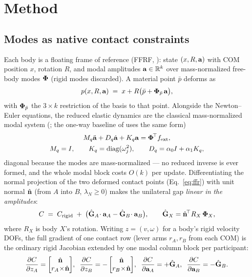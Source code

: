 \section{Method}
\label{sec:method}

\subsection{Modes as native contact constraints}
\label{sec:method:constraint}
Each body is a floating frame of reference (FFRF,
\citealp{shabana_multibody}): state
$(x,R,\mathbf{a})$ with COM position $x$, rotation $R$, and modal amplitudes
$\mathbf{a}\in\mathbb{R}^k$ over mass-normalized free-body modes $\boldsymbol{\Phi}$ (rigid
modes discarded). A material point $\bar p$ deforms as
\begin{equation}
  p(x,R,\mathbf{a}) \;=\; x + R\big(\bar p + \boldsymbol{\Phi}_{\bar p}\,\mathbf{a}\big),
  \label{eq:ffr}
\end{equation}
with $\boldsymbol{\Phi}_{\bar p}$ the $3\times k$ restriction of the basis to that point.
Alongside the Newton--Euler equations, the reduced elastic dynamics are the
classical mass-normalized modal system (\citealp{shabana_multibody,
james2002dyrt}; the one-way baseline of \citealp{coevoet2020distant} uses the
same form)
\begin{equation}
\begin{gathered}
  M_q\ddot{\mathbf{a}} + D_q\dot{\mathbf{a}} + K_q\mathbf{a} = \boldsymbol{\Phi}^{\!\top} f_{\mathrm{ext}},\\
  M_q=I,\qquad K_q=\operatorname{diag}(\omega_j^2),\qquad
  D_q=\alpha_0 I+\alpha_1 K_q,
\end{gathered}
  \label{eq:reduced}
\end{equation}
diagonal because the modes are mass-normalized --- no reduced inverse is ever
formed, and the whole modal block costs $O(k)$ per update. Differentiating the
normal projection of the two deformed contact points (Eq.~\ref{eq:ffr}) with unit
normal $\hat{\mathbf{n}}$ (from $A$ into $B$, $\lambda_N\ge0$) makes the unilateral gap
\emph{linear in the amplitudes}:
\begin{equation}
  C \;=\; C_{\mathrm{rigid}} \;+\; \big(\hat{\mathbf{G}}_A\!\cdot\mathbf{a}_A - \hat{\mathbf{G}}_B\!\cdot\mathbf{a}_B\big),
  \qquad \hat{\mathbf{G}}_X = \hat{\mathbf{n}}^{\!\top} R_X\, \boldsymbol{\Phi}_X ,
  \label{eq:gap}
\end{equation}
where $R_X$ is body $X$'s rotation. Writing $z=(v,\omega)$ for a body's rigid
velocity DOFs, the full gradient of one contact row (lever arms $r_A,r_B$ from each
COM) is the ordinary rigid Jacobian extended by one modal column block per
participant:
\begin{equation}
  \frac{\partial C}{\partial z_A} = \begin{bmatrix}\hat{\mathbf{n}}\\ r_A\!\times\!\hat{\mathbf{n}}\end{bmatrix}\!,
  \;\;
  \frac{\partial C}{\partial z_B} = -\begin{bmatrix}\hat{\mathbf{n}}\\ r_B\!\times\!\hat{\mathbf{n}}\end{bmatrix}\!,
  \;\;
  \frac{\partial C}{\partial \mathbf{a}_A} = +\hat{\mathbf{G}}_A,
  \;\;
  \frac{\partial C}{\partial \mathbf{a}_B} = -\hat{\mathbf{G}}_B.
  \label{eq:grad}
\end{equation}
